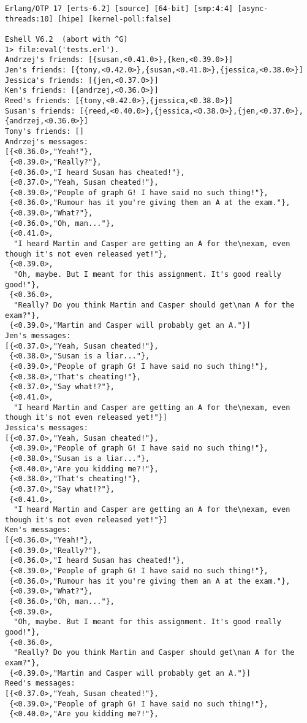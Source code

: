 \begin{verbatim}
Erlang/OTP 17 [erts-6.2] [source] [64-bit] [smp:4:4] [async-threads:10] [hipe] [kernel-poll:false]

Eshell V6.2  (abort with ^G)
1> file:eval('tests.erl').
Andrzej's friends: [{susan,<0.41.0>},{ken,<0.39.0>}]
Jen's friends: [{tony,<0.42.0>},{susan,<0.41.0>},{jessica,<0.38.0>}]
Jessica's friends: [{jen,<0.37.0>}]
Ken's friends: [{andrzej,<0.36.0>}]
Reed's friends: [{tony,<0.42.0>},{jessica,<0.38.0>}]
Susan's friends: [{reed,<0.40.0>},{jessica,<0.38.0>},{jen,<0.37.0>},{andrzej,<0.36.0>}]
Tony's friends: []
Andrzej's messages:
[{<0.36.0>,"Yeah!"},
 {<0.39.0>,"Really?"},
 {<0.36.0>,"I heard Susan has cheated!"},
 {<0.37.0>,"Yeah, Susan cheated!"},
 {<0.39.0>,"People of graph G! I have said no such thing!"},
 {<0.36.0>,"Rumour has it you're giving them an A at the exam."},
 {<0.39.0>,"What?"},
 {<0.36.0>,"Oh, man..."},
 {<0.41.0>,
  "I heard Martin and Casper are getting an A for the\nexam, even though it's not even released yet!"},
 {<0.39.0>,
  "Oh, maybe. But I meant for this assignment. It's good really good!"},
 {<0.36.0>,
  "Really? Do you think Martin and Casper should get\nan A for the exam?"},
 {<0.39.0>,"Martin and Casper will probably get an A."}]
Jen's messages:
[{<0.37.0>,"Yeah, Susan cheated!"},
 {<0.38.0>,"Susan is a liar..."},
 {<0.39.0>,"People of graph G! I have said no such thing!"},
 {<0.38.0>,"That's cheating!"},
 {<0.37.0>,"Say what!?"},
 {<0.41.0>,
  "I heard Martin and Casper are getting an A for the\nexam, even though it's not even released yet!"}]
Jessica's messages:
[{<0.37.0>,"Yeah, Susan cheated!"},
 {<0.39.0>,"People of graph G! I have said no such thing!"},
 {<0.38.0>,"Susan is a liar..."},
 {<0.40.0>,"Are you kidding me?!"},
 {<0.38.0>,"That's cheating!"},
 {<0.37.0>,"Say what!?"},
 {<0.41.0>,
  "I heard Martin and Casper are getting an A for the\nexam, even though it's not even released yet!"}]
Ken's messages:
[{<0.36.0>,"Yeah!"},
 {<0.39.0>,"Really?"},
 {<0.36.0>,"I heard Susan has cheated!"},
 {<0.39.0>,"People of graph G! I have said no such thing!"},
 {<0.36.0>,"Rumour has it you're giving them an A at the exam."},
 {<0.39.0>,"What?"},
 {<0.36.0>,"Oh, man..."},
 {<0.39.0>,
  "Oh, maybe. But I meant for this assignment. It's good really good!"},
 {<0.36.0>,
  "Really? Do you think Martin and Casper should get\nan A for the exam?"},
 {<0.39.0>,"Martin and Casper will probably get an A."}]
Reed's messages:
[{<0.37.0>,"Yeah, Susan cheated!"},
 {<0.39.0>,"People of graph G! I have said no such thing!"},
 {<0.40.0>,"Are you kidding me?!"},

\end{verbatim}
